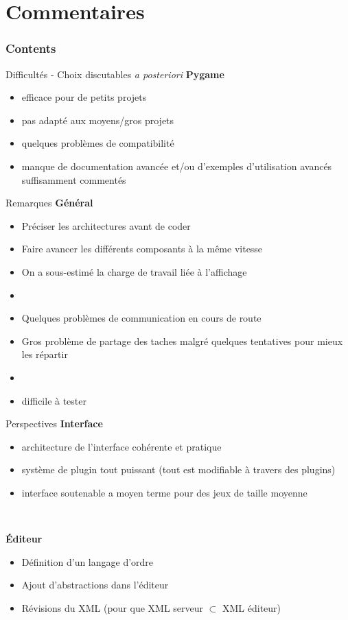 \documentclass[11pt]{beamer}
\begin{document}
\section{Commentaires}

    \begin{frame}
        \frametitle{Contents}
        \tableofcontents[currentsection]
    \end{frame}
    
\begin{frame}{Difficultés - Choix discutables \textit{a posteriori}}
	\textbf{Pygame}
	\begin{itemize}
		\item efficace pour de petits projets
		\item pas adapté aux moyens/gros projets
		\item quelques problèmes de compatibilité
		\item manque de documentation avancée et/ou d'exemples d'utilisation avancés suffisamment commentés
	\end{itemize}
\end{frame}


\begin{frame}{Remarques}
	\textbf{Général}
	\begin{itemize}
		\item Préciser les architectures avant de coder
		\item Faire avancer les différents composants à la même vitesse
		\item On a sous-estimé la charge de travail liée à l'affichage
		\item[]
		\item Quelques problèmes de communication en cours de route
		\item Gros problème de partage des taches malgré quelques tentatives pour mieux les répartir
		\item[]
		\item difficile à tester
	\end{itemize}
\end{frame}


\begin{frame}{Perspectives}
	\textbf{Interface}
	\begin{itemize}
		\item architecture de l'interface cohérente et pratique
		\item système de plugin tout puissant (tout est modifiable à travers des plugins)
		\item interface soutenable a moyen terme pour des jeux de taille moyenne
	\end{itemize}
	
	~
	
	\textbf{Éditeur}
	\begin{itemize}
		\item Définition d'un langage d'ordre
		\item Ajout d'abstractions dans l'éditeur
		\item Révisions du XML (pour que XML serveur $\subset$ XML éditeur)
	\end{itemize}
\end{frame}
\end{document}

